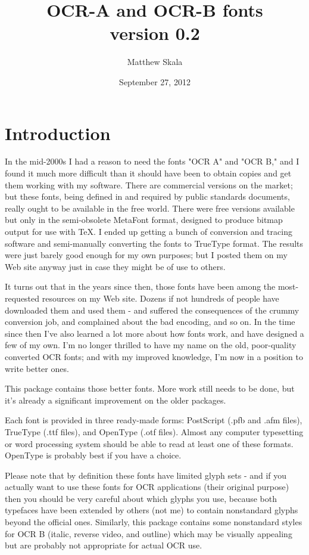 \documentclass{article}
\title{OCR-A and OCR-B fonts\\version 0.2}
\author{Matthew Skala}
\date{September 27, 2012}
\begin{document}
\setmainfont{OCRB.otf}
\setmonofont{OCRB.otf}

\maketitle

\section{Introduction}

In the mid-2000s I had a reason to need the fonts "OCR A" and "OCR B," and I
found it much more difficult than it should have been to obtain copies and
get them working with my software.  There are commercial versions on the
market; but these fonts, being defined in and required by public standards
documents, really ought to be available in the free world.  There were free
versions available but only in the semi-obsolete MetaFont format, designed
to produce bitmap output for use with TeX\@.  I ended up getting a bunch of
conversion and tracing software and semi-manually converting the fonts to
TrueType format.  The results were just barely good enough for my own
purposes; but I posted them on my Web site anyway just in case they might be
of use to others.

It turns out that in the years since then, those fonts have been among the
most-requested resources on my Web site.  Dozens if not hundreds of people
have downloaded them and used them - and suffered the consequences of the
crummy conversion job, and complained about the bad encoding, and so on.  In
the time since then I've also learned a lot more about how fonts work, and
have designed a few of my own.  I'm no longer thrilled to have my name on
the old, poor-quality converted OCR fonts; and with my improved knowledge,
I'm now in a position to write better ones.

This package contains those better fonts.  More work still needs to be done,
but it's already a significant improvement on the older packages.

Each font is provided in three ready-made forms:  PostScript (.pfb and .afm
files), TrueType (.ttf files), and OpenType (.otf files).  Almost any
computer typesetting or word processing system should be able to read at
least one of these formats.  OpenType is probably best if you have a choice.

Please note that by definition these fonts have limited glyph sets - and
if you actually want to use these fonts for OCR applications (their original
purpose) then you should be very careful about which glyphs you use, because
both typefaces have been extended by others (not me) to contain nonstandard
glyphs beyond the official ones.  Similarly, this package contains some
nonstandard styles for OCR B (italic, reverse video, and outline) which
may be visually appealing but are probably not appropriate for actual
OCR use.
\end{document}
